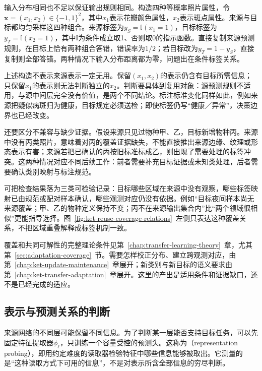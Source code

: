 输入分布相同也不足以保证输出规则相同。构造四种等概率照片属性，令$\bm{x}=(x_1,x_2)\in\{-1,1\}^2$，其中$x_1$表示花瓣颜色属性，$x_2$表示斑点属性。来源与目标都均匀采样这四种组合。来源标签为$y_S=\mathbb{I}(x_1=1)$，目标标签为$y_T=\mathbb{I}(x_2=1)$，其中$\mathbb{I}$为条件成立取1、否则取0的指示函数。直接复制来源预测规则，在目标上恰有两种组合答错，错误率为$1/2$；若目标改为$y_T=1-y_S$，直接复制则全部答错。两种情况下输入分布距离都为零，问题出在条件标签关系。

上述构造不表示来源表示一定无用。保留$(x_1,x_2)$的表示仍含有目标所需信息；只保留$x_1$的表示则无法判断独立的$x_2$。判断要具体到复用对象：源预测规则不适用，与源中间层完全没有价值，是两个不同结论。标注标准变化同样如此，例如来源把疑似病斑归为健康，目标规定必须送检；即使标签仍写“健康／异常”，决策边界也已经改变。

还要区分不兼容与缺少证据。假设来源只见过物种甲、乙，目标新增物种丙。来源中没有丙类照片，意味着对丙的覆盖证据缺失，不能直接推出来源边缘、纹理或形态表示有害；来源若把已确认的丙按旧标准标成乙，则出现了需要处理的标签冲突。这两种情况对应不同后续工作：前者需要补充目标证据或未知类处理，后者需要确认类别映射与标注规范。

可把检查结果落为三类可检验记录：目标哪些区域在来源中没有观察，哪些标签映射已由规范或配对样本确认，哪些观测对应仍没有依据。例如“目标夜间样本尚无来源覆盖；甲、乙的物种定义保持不变；丙不在来源输出集合内”比“两个领域很相似”更能指导选择。图~\ref{fig:ket-reuse-coverage-relations}~左侧只表达这种覆盖关系，不把区域重叠解释成标签机制一致。

覆盖和共同可解性的完整理论条件见第~\ref{chap:transfer-learning-theory}~章，尤其第~\ref{sec:adaptation-coverage}~节。需要怎样校正分布、建立跨观测对应，由第~\ref{chap:ket-update-maintenance}~章展开；新类别与新目标的语义要求由第~\ref{chap:ket-transfer-adaptation}~章展开。这里的产出是适用条件和证据缺口，还不是已经完成的适应。

\subsection{表示与预测关系的判断}
\label{sec:ket-reuse-representation}

来源网络的不同层可能保留不同信息。为了判断某一层能否支持目标任务，可以先固定特征提取器$\phi_\ell$，只训练一个容量受控的预测头。这称为（representation probing），即用约定难度的读取器检验特征中哪些信息能够被取出。它测量的是“这种读取方式下可用的信息”，不是对表示所含全部信息的穷尽判断。

